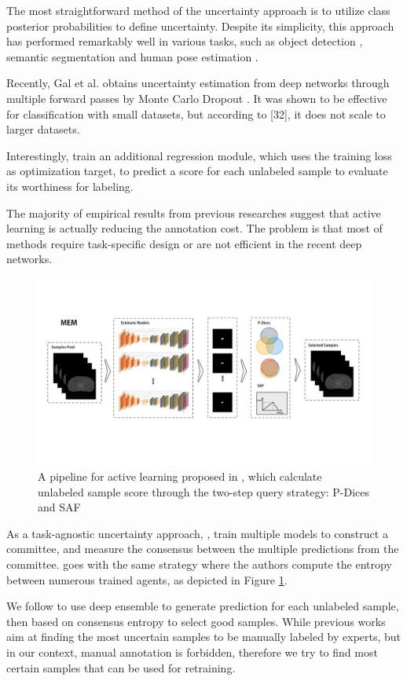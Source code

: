 The most straightforward method of the uncertainty approach is to utilize class posterior probabilities to define uncertainty. Despite its simplicity, this approach has performed remarkably well in various tasks, such as object detection \cite{wang2018towardshuman}, semantic segmentation \cite{jain2016activesegmentationprop} and human pose estimation \cite{liu2017activehumanpose}.

Recently, Gal et al. \cite{gal2017deep} obtains uncertainty estimation from deep networks through multiple forward passes by Monte Carlo Dropout \cite{gal2016dropout}. It was shown to be effective for classification with small datasets, but according to [32], it does not scale to larger datasets.

Interestingly, \cite{yoo2019learningloss} train an additional regression module, which uses the training loss as optimization target, to predict a score for each unlabeled sample to evaluate its worthiness for labeling. 

The majority of empirical results from previous researches suggest that active learning is actually reducing the annotation cost. The problem is that most of methods require task-specific design or are not efficient in the recent deep networks.

\begin{figure}[h]
    \centering
    \includegraphics[width=\textwidth]{content/resources/new_images/related_works/pdices.pdf}
    \caption{A pipeline for active learning proposed in \cite{wang2019twostagequery}, which calculate unlabeled sample score through the two-step query strategy: P-Dices and SAF}
    \label{fig:pdices}
\end{figure}

As a task-agnostic uncertainty approach, \cite{seung1992query}, \cite{beluch2018power} train multiple models to construct a committee, and measure the consensus between the multiple predictions from the committee. \cite{wang2019twostagequery} goes with the same strategy where the authors compute the entropy between numerous trained agents, as depicted in Figure \ref{fig:pdices}.

We follow \cite{wang2019twostagequery} to use deep ensemble to generate prediction for each unlabeled sample, then based on consensus entropy to select good samples. While previous works aim at finding the most uncertain samples to be manually labeled by experts, but in our context, manual annotation is forbidden, therefore we try to find most certain samples that can be used for retraining.